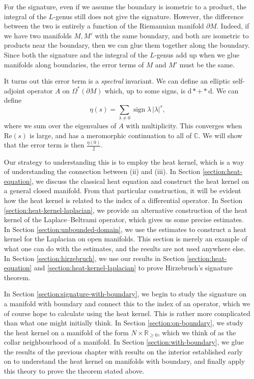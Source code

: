 \documentclass{shortart}
\theoremstyle{definition}
\newcommand\R{\mathbb{R}}
\newcommand\C{\mathbb{C}}
\renewcommand\d{\mathrm{d}}
\renewcommand\Re{\mathrm{Re}}
\DeclareMathOperator\sign{sign}
\begin{document}
For the signature, even if we assume the boundary is isometric to a product, the integral of the $L$-genus still does not give the signature. However, the difference between the two is entirely a function of the Riemannian manifold $\partial M$. Indeed, if we have two manifolds $M, M'$ with the same boundary, and both are isometric to products near the boundary, then we can glue them together along the boundary. Since both the signature and the integral of the $L$-genus add up when we glue manifolds along boundaries, the error terms of $M$ and $M'$ must be the same.

It turns out this error term is a \emph{spectral} invariant. We can define an elliptic self-adjoint operator $A$ on $\Omega^*(\partial M)$ which, up to some signs, is $\d * + * \d$. We can define
\[
  \eta(s) = \sum_{\lambda \not= 0} \sign \lambda\, |\lambda|^s,
\]
where we sum over the eigenvalues of $A$ with multiplicity. This converges when $\Re (s)$ is large, and has a meromorphic continuation to all of $\C$. We will show that the error term is then $\frac{\eta(0)}{2}$.

Our strategy to understanding this is to employ the heat kernel, which is a way of understanding the connection between (ii) and (iii). In Section \ref{section:heat-equation}, we discuss the classical heat equation and construct the heat kernel on a general closed manifold. From that particular construction, it will be evident how the heat kernel is related to the index of a differential operator. In Section \ref{section:heat-kernel-laplacian}, we provide an alternative construction of the heat kernel of the Laplace--Beltrami operator, which gives us some precise estimates. In Section \ref{section:unbounded-domain}, we use the estimates to construct a heat kernel for the Laplacian on open manifolds. This section is merely an example of what one can do with the estimates, and the results are not used anywhere else. In Section \ref{section:hirzebruch}, we use our results in Section \ref{section:heat-equation} and \ref{section:heat-kernel-laplacian} to prove Hirzebruch's signature theorem.

In Section \ref{section:signature-with-boundary}, we begin to study the signature on a manifold with boundary and connect this to the index of an operator, which we of course hope to calculate using the heat kernel. This is rather more complicated than what one might initially think. In Section \ref{section:on-boundary}, we study the heat kernel on a manifold of the form $N \times \R_{\geq 0}$, which we think of as the collar neighbourhood of a manifold. In Section \ref{section:with-boundary}, we glue the results of the previous chapter with results on the interior established early on to understand the heat kernel on manifolds with boundary, and finally apply this theory to prove the theorem stated above.
\end{document}
